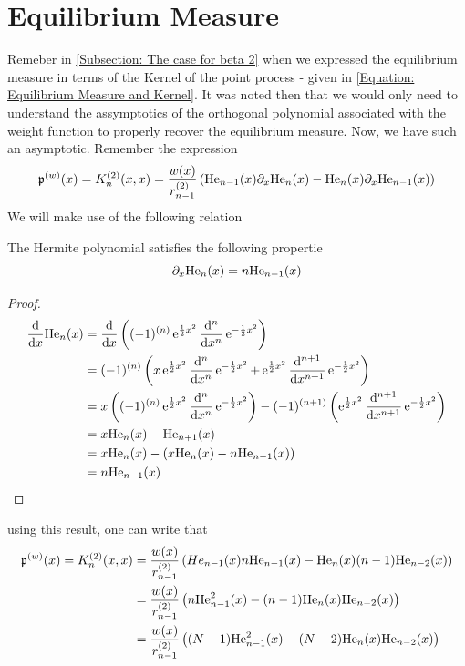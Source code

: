 \section{Equilibrium Measure}

Remeber in \ref{Subsection: The case for beta 2} when we expressed the equilibrium measure in terms of the Kernel of the point process - given in \ref{Equation: Equilibrium Measure and Kernel}. It was noted then that we would only need to understand the assymptotics of the orthogonal polynomial associated with the weight function to properly recover the equilibrium measure. Now, we have such an asymptotic. Remember the expression
\begin{equation}
	\mathfrak{p}^{(w)}(x) = K_n^{(2)}(x, x) = \frac{w(x)}{r_{n-1}^{(2)}} \left( \mathrm{He}_{n-1}(x)\partial_x \mathrm{He}_n(x) - \mathrm{He}_{n}(x)\partial_x \mathrm{He}_{n-1}(x)  \right)
\end{equation}
We will make use of the following relation
\begin{definition}
	The Hermite polynomial satisfies the following propertie
	\begin{equation}
		\partial_x \mathrm{He}_{n}(x) = n \mathrm{He}_{n-1}(x)
	\end{equation}
\end{definition}
\begin{proof}
\begin{align}
		 \frac{\mathrm{d}}{\mathrm{d} x} \mathrm{He}_n(x) & = \frac{\mathrm{d}}{\mathrm{d} x} \left( (-1)^{(n)}\operatorname{e}^{\frac{1}{2} x^2} \frac{\mathrm{d}^n}{\mathrm{d} x^n} \operatorname{e}^{-\frac{1}{2} x^2} \right) \\
		 & = (-1)^{(n)}  \left( x \operatorname{e}^{\frac{1}{2} x^2} \frac{\mathrm{d}^n}{\mathrm{d} x^n} \operatorname{e}^{-\frac{1}{2} x^2} +  \operatorname{e}^{\frac{1}{2} x^2} \frac{\mathrm{d}^{n+1}}{\mathrm{d} x^{n+1}} \operatorname{e}^{-\frac{1}{2} x^2}  \right) \\
		 & =  x \left( (-1)^{(n)}  \operatorname{e}^{\frac{1}{2} x^2} \frac{\mathrm{d}^n}{\mathrm{d} x^n} \operatorname{e}^{-\frac{1}{2} x^2} \right) -   (-1)^{(n+1)} \left(  \operatorname{e}^{\frac{1}{2} x^2} \frac{\mathrm{d}^{n+1}}{\mathrm{d} x^{n+1}} \operatorname{e}^{-\frac{1}{2} x^2} \right)  \\
		 & = x \mathrm{He}_n(x) - \mathrm{He}_{n+1}(x) \\
		 & = x \mathrm{He}_n(x) - \left(  x\mathrm{He}_n(x) - n \mathrm{He}_{n-1}(x) \right) \\
		 & =  n \mathrm{He}_{n-1}(x) 
	\end{align}
\end{proof}
using this result, one can write that
\begin{align}
		\mathfrak{p}^{(w)}(x) = K_n^{(2)}(x, x) & = \frac{w(x)}{r_{n-1}^{(2)}} \left( He_{n-1}(x)  n \mathrm{He}_{n-1}(x) - \mathrm{He}_{n}(x)(n-1) \mathrm{He}_{n-2}(x)   \right) \\
		& = \frac{w(x)}{r_{n-1}^{(2)}} \left( n \mathrm{He}^2_{n-1}(x) - (n-1)  \mathrm{He}_{n}(x)\mathrm{He}_{n-2}(x)   \right) \\
		& = \frac{w(x)}{r_{n-1}^{(2)}} \left( (N-1) \mathrm{He}^2_{n-1}(x) - (N-2)  \mathrm{He}_{n}(x)\mathrm{He}_{n-2}(x)   \right) \\
\end{align}
